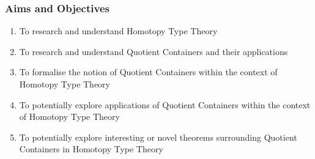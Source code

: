 \documentclass{beamer}
\begin{document}

\begin{frame}
\frametitle{Aims and Objectives}
\begin{enumerate}
\item To research and understand Homotopy Type Theory
\item To research and understand Quotient Containers and their applications
\item To formalise the notion of Quotient Containers within the context of Homotopy Type Theory
\item To potentially explore applications of Quotient Containers within the context of Homotopy Type Theory
\item To potentially explore interesting or novel theorems surrounding Quotient Containers in Homotopy Type Theory
\end{enumerate}
\end{frame}

\end{document}
